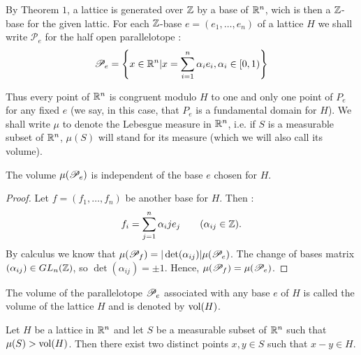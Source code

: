By Theorem $1$, a lattice is generated over $\mathbb{Z}$ by a base of $\mathbb{R}^n$, wich is then a $\mathbb{Z}$-base for the given lattic. For each $\mathbb{Z}$-base $e = (e_1,\ldots, e_n)$ of a lattice $H$ we shall write $\mathscr{P}_e$ for the half open parallelotope :
\[\mathscr{P}_e = \left\{x\in \mathbb{R}^n | x = \sum_{i=1}^n \alpha_i e_i, \alpha_i \in [0,1)\right\}\]

Thus every point of $\mathbb{R}^n$ is congruent modulo $H$ to one and only one point of $P_e$ for any fixed $e$ (we say, in this case, that $P_e$ is a fundamental domain for $H$). We shall write $\mu$ to denote the Lebesgue measure in $\mathbb{R}^n$, i.e. if $S$ is a measurable subset of $\mathbb{R}^n$, $\mu(S)$ will stand for its measure (which we will also call its volume).


\begin{lemma}
  The volume $\mu(\mathscr{P}_e)$ is independent of the base $e$ chosen for $H$.
\end{lemma}

\begin{proof}
  Let $f = (f_1,\ldots, f_n)$ be another base for $H$. Then :
\[f_i = \sum_{j=1}^n \alpha_ij e_j \tag{$\alpha_{ij}\in \Z$}.\]
By calculus we know that $\mu(\mathscr{P}_f)=|\det({\alpha_{ij}})|\mu(\mathscr{P}_e)$. The change of bases matrix $(\alpha_{ij}) \in GL_n(\mathbb{Z})$, so $\det{(\alpha_{ij})}=\pm 1$. Hence, $\mu(\mathscr{P}_f)=\mu(\mathscr{P}_e)$.
\end{proof}

\begin{definition}
  The volume of the parallelotope $\mathscr{P}_e$ associated with any base $e$ of $H$ is called the volume of the lattice $H$ and is denoted by $\operatorname{vol}(H)$.
\end{definition}

\begin{theorem}[Minkowski]
  Let $H$ be a lattice in $\mathbb{R}^n$ and let $S$ be a measurable subset of $\mathbb{R}^n$ such that $\mu(S)> \operatorname{vol}(H)$. Then there exist two distinct points $x,y\in S$ such that $x-y\in H$.
\end{theorem}

